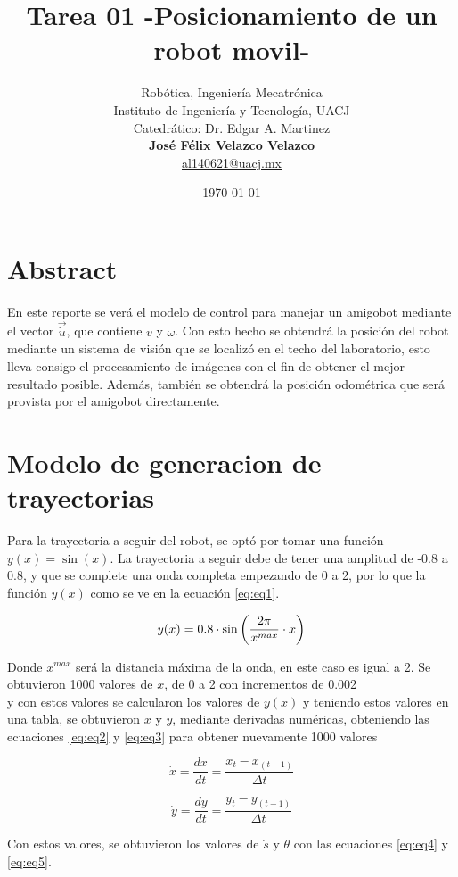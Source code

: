 \documentclass[spanish,10pt,letterpaper, twocolumn]{article}
\title{Tarea 01 -Posicionamiento de un robot movil-}
\author{Rob\'otica, Ingenier\'ia Mecatr\'onica\\
Instituto de Ingenier\'ia y Tecnolog\'ia, UACJ\\
Catedr\'atico: Dr. Edgar A. Martinez\\
\textbf{Jos\'e F\'elix Velazco Velazco}\\ 
\url{al140621@uacj.mx}
}
\date{\today}
\begin{document}
\maketitle

\section*{Abstract}
En este reporte se ver\'a el modelo de control para manejar un amigobot mediante el vector $\vec{\dot{u}}$, que contiene $v$ y $\omega$. Con esto hecho se obtendr\'a la posici\'on del robot mediante un sistema de visi\'on que se localiz\'o en el techo del laboratorio, esto lleva consigo el procesamiento de im\'agenes con el fin de obtener el mejor resultado posible. Adem\'as, tambi\'en se obtendr\'a la posici\'on odom\'etrica que ser\'a provista por el amigobot directamente.
\section{Modelo de generacion de trayectorias}
Para la trayectoria a seguir del robot, se opt\'o por tomar una funci\'on $y(x)=\sin(x)$. La trayectoria a seguir debe de tener una amplitud de -0.8 a 0.8, y que se complete una onda completa empezando de 0 a 2, por lo que la funci\'on $y(x)$ como se ve en la ecuaci\'on \eqref{eq:eq1}.

\begin{equation}
{
	\label{eq:eq1}
	y(x)=0.8\cdot \sin\left( \frac{2\pi}{x^{max}}\cdot x\right) 
}
\end{equation}

Donde $x^{max}$ ser\'a la distancia m\'axima de la onda, en este caso es igual a 2.
Se obtuvieron 1000 valores de $x$, de 0 a 2 con incrementos de 0.002\\
y con estos valores se calcularon los valores de $y(x)$ y teniendo estos valores en una tabla, se obtuvieron $\dot{x}$ y $\dot{y}$, mediante derivadas num\'ericas, obteniendo las ecuaciones \eqref{eq:eq2} y \eqref{eq:eq3} para obtener nuevamente 1000 valores

\begin{equation}
	\label{eq:eq2}
	\dot{x}=\frac{dx}{dt}=\frac{x_t-x_{(t-1)}}{\Delta t}
\end{equation} 

\begin{equation}
	\label{eq:eq3}
	\dot{y}=\frac{dy}{dt}=\frac{y_t-y_{(t-1)}}{\Delta t}
\end{equation} 

Con estos valores, se obtuvieron los valores de $\dot{s}$ y $\theta$ con las ecuaciones \eqref{eq:eq4} y \eqref{eq:eq5}.
\end{document}

